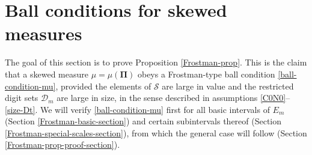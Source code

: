 \documentclass[12pt, twoside]{article}
\theoremstyle{definition}
\numberwithin{equation}{section}
\begin{document}
%

\section{Ball conditions for skewed measures} \label{Frostman-section} 
The goal of this section is to prove Proposition \ref{Frostman-prop}. This is the claim that a skewed measure $\mu = \mu(\pmb{\Pi})$ obeys a Frostman-type ball condition \eqref{ball-condition-mu}, provided the elements of $\mathcal S$ are large in value and the restricted digit sets $\mathscr{D}_m$ are large in size, in the sense described in assumptions \eqref{C0N0}--\eqref{size-Dt}. We will verify \eqref{ball-condition-mu} first for all basic intervals of $E_m$ (Section \ref{Frostman-basic-section}) and certain subintervals thereof (Section \ref{Frostman-special-scales-section}), from which the general case will follow (Section \ref{Frostman-prop-proof-section}).    
\end{document}
